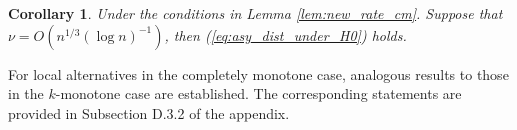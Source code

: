 \documentclass[12pt,letterpaper, twoside, openany]{article}
\theoremstyle{plain}
\newtheorem{corollary}[theorem]{Corollary}
\begin{document}
    
		\begin{corollary}\label{thm:simple_CM_null}
	Under the conditions in Lemma \ref{lem:new_rate_cm}.	
  Suppose that $\nu = O(n^{1/3}(\log n)^{-1})$, then (\ref{eq:asy_dist_under_H0}) holds.
		\end{corollary}
  

  For local alternatives in the completely monotone case, analogous results to those in the $k$-monotone case are established. The corresponding statements are provided in Subsection D.3.2 of the appendix.
		
		
		
\end{document}
